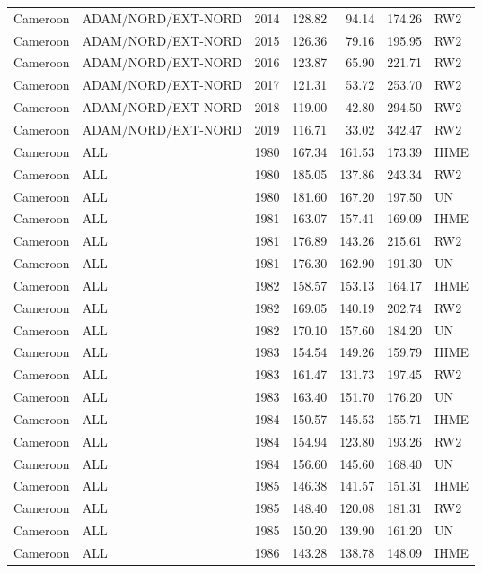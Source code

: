 \begin{longtable}{lllrrrl}
  Cameroon & ADAM/NORD/EXT-NORD & 2014 & 128.82 & 94.14 & 174.26 & RW2 \\ 
  Cameroon & ADAM/NORD/EXT-NORD & 2015 & 126.36 & 79.16 & 195.95 & RW2 \\ 
  Cameroon & ADAM/NORD/EXT-NORD & 2016 & 123.87 & 65.90 & 221.71 & RW2 \\ 
  Cameroon & ADAM/NORD/EXT-NORD & 2017 & 121.31 & 53.72 & 253.70 & RW2 \\ 
  Cameroon & ADAM/NORD/EXT-NORD & 2018 & 119.00 & 42.80 & 294.50 & RW2 \\ 
  Cameroon & ADAM/NORD/EXT-NORD & 2019 & 116.71 & 33.02 & 342.47 & RW2 \\ 
  Cameroon & ALL & 1980 & 167.34 & 161.53 & 173.39 & IHME \\ 
  Cameroon & ALL & 1980 & 185.05 & 137.86 & 243.34 & RW2 \\ 
  Cameroon & ALL & 1980 & 181.60 & 167.20 & 197.50 & UN \\ 
  Cameroon & ALL & 1981 & 163.07 & 157.41 & 169.09 & IHME \\ 
  Cameroon & ALL & 1981 & 176.89 & 143.26 & 215.61 & RW2 \\ 
  Cameroon & ALL & 1981 & 176.30 & 162.90 & 191.30 & UN \\ 
  Cameroon & ALL & 1982 & 158.57 & 153.13 & 164.17 & IHME \\ 
  Cameroon & ALL & 1982 & 169.05 & 140.19 & 202.74 & RW2 \\ 
  Cameroon & ALL & 1982 & 170.10 & 157.60 & 184.20 & UN \\ 
  Cameroon & ALL & 1983 & 154.54 & 149.26 & 159.79 & IHME \\ 
  Cameroon & ALL & 1983 & 161.47 & 131.73 & 197.45 & RW2 \\ 
  Cameroon & ALL & 1983 & 163.40 & 151.70 & 176.20 & UN \\ 
  Cameroon & ALL & 1984 & 150.57 & 145.53 & 155.71 & IHME \\ 
  Cameroon & ALL & 1984 & 154.94 & 123.80 & 193.26 & RW2 \\ 
  Cameroon & ALL & 1984 & 156.60 & 145.60 & 168.40 & UN \\ 
  Cameroon & ALL & 1985 & 146.38 & 141.57 & 151.31 & IHME \\ 
  Cameroon & ALL & 1985 & 148.40 & 120.08 & 181.31 & RW2 \\ 
  Cameroon & ALL & 1985 & 150.20 & 139.90 & 161.20 & UN \\ 
  Cameroon & ALL & 1986 & 143.28 & 138.78 & 148.09 & IHME \\ 

\end{longtable}
